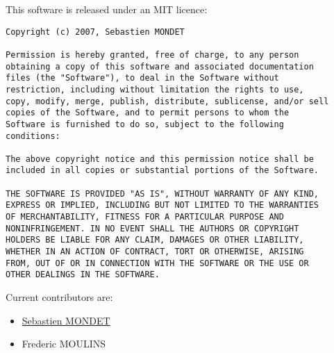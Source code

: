 This software is released under an MIT licence:

\begin{verbatim}
Copyright (c) 2007, Sebastien MONDET

Permission is hereby granted, free of charge, to any person
obtaining a copy of this software and associated documentation
files (the "Software"), to deal in the Software without
restriction, including without limitation the rights to use,
copy, modify, merge, publish, distribute, sublicense, and/or sell
copies of the Software, and to permit persons to whom the
Software is furnished to do so, subject to the following
conditions:

The above copyright notice and this permission notice shall be
included in all copies or substantial portions of the Software.

THE SOFTWARE IS PROVIDED "AS IS", WITHOUT WARRANTY OF ANY KIND,
EXPRESS OR IMPLIED, INCLUDING BUT NOT LIMITED TO THE WARRANTIES
OF MERCHANTABILITY, FITNESS FOR A PARTICULAR PURPOSE AND
NONINFRINGEMENT. IN NO EVENT SHALL THE AUTHORS OR COPYRIGHT
HOLDERS BE LIABLE FOR ANY CLAIM, DAMAGES OR OTHER LIABILITY,
WHETHER IN AN ACTION OF CONTRACT, TORT OR OTHERWISE, ARISING
FROM, OUT OF OR IN CONNECTION WITH THE SOFTWARE OR THE USE OR
OTHER DEALINGS IN THE SOFTWARE.
\end{verbatim}
Current contributors are:

\begin{itemize}
\item \href{http://sebmdt.googlepages.com}{Sebastien MONDET}
\item Frederic MOULINS
\end{itemize}




